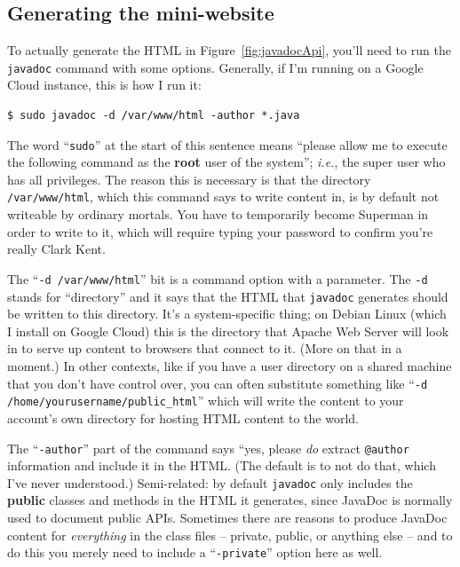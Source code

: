 \subsection{Generating the mini-website}

To actually generate the HTML in Figure~\ref{fig:javadocApi}, you'll need to
run the \texttt{javadoc} command with some options. Generally, if I'm running
on a Google Cloud instance, this is how I run it:

\begin{Verbatim}[fontsize=\small,samepage=true,frame=none]
$ sudo javadoc -d /var/www/html -author *.java
\end{Verbatim}

The word ``\texttt{sudo}'' at the start of this sentence means ``please allow
me to execute the following command as the \textbf{root} user of the system'';
\textit{i.e.}, the super user who has all privileges. The reason this is
necessary is that the directory \texttt{/var/www/html}, which this command
says to write content in, is by default not writeable by ordinary mortals. You
have to temporarily become Superman in order to write to it, which will
require typing your password to confirm you're really Clark Kent.

The ``\texttt{-d /var/www/html}'' bit is a command option with a parameter. The
\texttt{-d} stands for ``directory'' and it says that the HTML that
\texttt{javadoc} generates should be written to this directory. It's a
system-specific thing; on Debian Linux (which I install on Google Cloud) this
is the directory that Apache Web Server will look in to serve up content to
browsers that connect to it. (More on that in a moment.) In other contexts,
like if you have a user directory on a shared machine that you don't have
control over, you can often substitute something like ``\texttt{-d
/home/yourusername/public\_html}'' which will write the content to your
account's own directory for hosting HTML content to the world.

The ``\texttt{-author}'' part of the command says ``yes, please \textit{do}
extract \texttt{@author} information and include it in the HTML. (The default
is to not do that, which I've never understood.) Semi-related: by default
\texttt{javadoc} only includes the \textbf{public} classes and methods in the
HTML it generates, since JavaDoc is normally used to document public APIs.
Sometimes there are reasons to produce JavaDoc content for \textit{everything}
in the class files -- private, public, or anything else -- and to do this you
merely need to include a ``\texttt{-private}'' option here as well.

